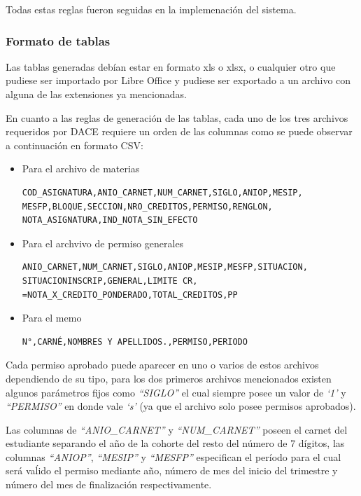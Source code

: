\documentclass[]{article}
\begin{document}
Todas estas reglas fueron seguidas en la implemenación del sistema.

\subsubsection{Formato de tablas}\label{formato-de-tablas}

Las tablas generadas debían estar en formato xls o xlsx, o cualquier
otro que pudiese ser importado por Libre Office y pudiese ser exportado
a un archivo con alguna de las extensiones ya mencionadas.

En cuanto a las reglas de generación de las tablas, cada uno de los tres
archivos requeridos por DACE requiere un orden de las columnas como se
puede observar a continuación en formato CSV:

\begin{itemize}
\item
  Para el archivo de materias

\begin{verbatim}
COD_ASIGNATURA,ANIO_CARNET,NUM_CARNET,SIGLO,ANIOP,MESIP,
MESFP,BLOQUE,SECCION,NRO_CREDITOS,PERMISO,RENGLON,
NOTA_ASIGNATURA,IND_NOTA_SIN_EFECTO
\end{verbatim}
\item
  Para el archvivo de permiso generales

\begin{verbatim}
ANIO_CARNET,NUM_CARNET,SIGLO,ANIOP,MESIP,MESFP,SITUACION,
SITUACIONINSCRIP,GENERAL,LIMITE CR,
=NOTA_X_CREDITO_PONDERADO,TOTAL_CREDITOS,PP
\end{verbatim}
\item
  Para el memo

\begin{verbatim}
N°,CARNÉ,NOMBRES Y APELLIDOS.,PERMISO,PERIODO
\end{verbatim}
\end{itemize}

Cada permiso aprobado puede aparecer en uno o varios de estos archivos
dependiendo de su tipo, para los dos primeros archivos mencionados
existen algunos parámetros fijos como \emph{``SIGLO''} el cual siempre
posee un valor de \emph{`1'} y \emph{``PERMISO''} en donde vale
\emph{`s'} (ya que el archivo solo posee permisos aprobados).

Las columnas de \emph{``ANIO\_CARNET''} y \emph{``NUM\_CARNET''} poseen
el carnet del estudiante separando el año de la cohorte del resto del
número de 7 dígitos, las columnas \emph{``ANIOP''}, \emph{``MESIP''} y
\emph{``MESFP''} especifican el período para el cual será vaĺido el
permiso mediante año, número de mes del inicio del trimestre y número
del mes de finalización respectivamente.
\end{document}
